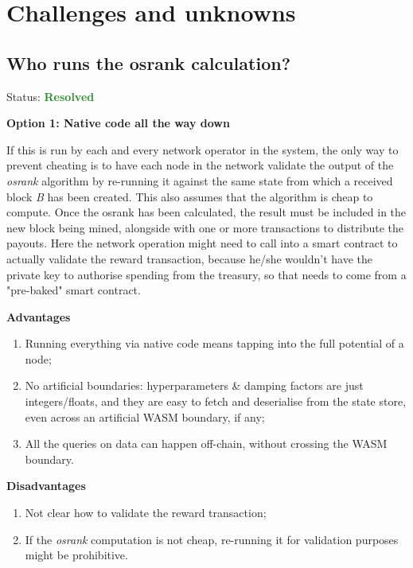 \documentclass{article}
\begin{document}
\section{Challenges and unknowns}

\subsection{Who runs the osrank calculation?}

Status: \textcolor{ForestGreen}{\textbf{Resolved}}

\textbf{Option 1: Native code all the way down}

If this is run by each and every network operator in the system, the only
way to prevent cheating is to have each node in the network validate the output
of the \textit{osrank} algorithm by re-running it against the same state from which
a received block \textit{B} has been created. This also assumes that the algorithm
is cheap to compute. Once the osrank has been calculated, the result must be included
in the new block being mined, alongside with one or more transactions to distribute
the payouts. Here the network operation might need to call into a
smart contract to actually validate the reward transaction, because he/she
wouldn't have the private key to authorise spending from the treasury, so
that needs to come from a "pre-baked" smart contract.

\textbf{Advantages}

\begin{enumerate}
\item Running everything via native code means tapping into the full potential
of a node;
\item No artificial boundaries: hyperparameters \& damping factors are just
      integers/floats, and they are easy to fetch and deserialise from the
      state store, even across an artificial WASM boundary, if any;
\item All the queries on data can happen off-chain, without crossing the
      WASM boundary.
\end{enumerate}

\textbf{Disadvantages}

\begin{enumerate}
\item Not clear how to validate the reward transaction;
\item If the \textit{osrank} computation is not cheap, re-running it for
      validation purposes might be prohibitive.
\end{enumerate}
\end{document}
